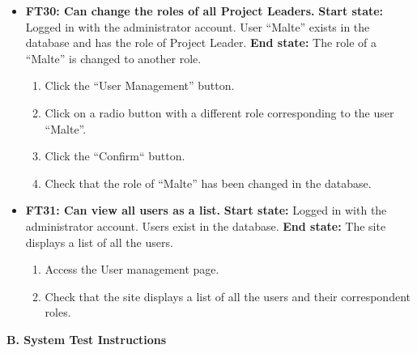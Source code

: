 \documentclass{article}
\begin{document}
\begin{itemize}
		
		\item \textbf{FT30: Can change the roles of all Project Leaders.} \newline
		\textbf{Start state:} Logged in with the administrator account. User “Malte” exists in the database and has the role of Project Leader.\newline
		\textbf{End state:}  The role of a “Malte” is changed to another role.
		\begin{enumerate}
			\item Click the “User Management” button.
			\item Click on a radio button with a different role corresponding to the user “Malte”.
			\item Click the “Confirm“ button.
			\item Check that the role of “Malte” has been changed in the database.
		\end{enumerate}
		
		
		\item \textbf{FT31: Can view all users as a list.} \newline
		\textbf{Start state:} Logged in with the administrator account. Users exist in the database.  \newline
		\textbf{End state:} The site displays a list of all the users.
		\begin{enumerate}
			\item Access the User management page.
			\item Check that the site displays a list of all the users and their correspondent roles. 
		\end{enumerate}
		
\end{itemize}

\newpage
\begin{flushleft}	
{\large \textbf{B. System Test Instructions}}
\end{flushleft}
\end{document}
